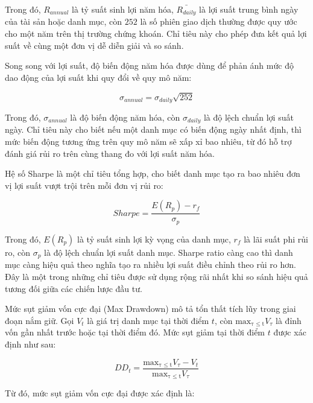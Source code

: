 \documentclass[12pt,a4paper,openany,oneside]{book}
\begin{document}
Trong đó, \({R}_{annual}\) là tỷ suất sinh lợi năm hóa, \(\bar{{R}_{daily}}\) là lợi suất trung bình ngày của tài sản hoặc danh mục, còn \(252\) là số phiên giao dịch thường được quy ước cho một năm trên thị trường chứng khoán. Chỉ tiêu này cho phép đưa kết quả lợi suất về cùng một đơn vị dễ diễn giải và so sánh.

Song song với lợi suất, độ biến động năm hóa được dùng để phản ánh mức độ dao động của lợi suất khi quy đổi về quy mô năm:

\begin{equation}\label{eq:theory-17}
{\sigma}_{annual}={\sigma}_{daily}\sqrt{252}
\end{equation}

Trong đó, \({\sigma}_{annual}\) là độ biến động năm hóa, còn \({\sigma}_{daily}\) là độ lệch chuẩn lợi suất ngày. Chỉ tiêu này cho biết nếu một danh mục có biến động ngày nhất định, thì mức biến động tương ứng trên quy mô năm sẽ xấp xỉ bao nhiêu, từ đó hỗ trợ đánh giá rủi ro trên cùng thang đo với lợi suất năm hóa.

Hệ số Sharpe là một chỉ tiêu tổng hợp, cho biết danh mục tạo ra bao nhiêu đơn vị lợi suất vượt trội trên mỗi đơn vị rủi ro:

\begin{equation}\label{eq:theory-18}
Sharpe=\frac{E\left({R}_{p}\right)-{r}_{f}}{{\sigma}_{p}}
\end{equation}

Trong đó, \(E\left({R}_{p}\right)\) là tỷ suất sinh lợi kỳ vọng của danh mục, \({r}_{f}\) là lãi suất phi rủi ro, còn \({\sigma}_{p}\) là độ lệch chuẩn lợi suất danh mục. Sharpe ratio càng cao thì danh mục càng hiệu quả theo nghĩa tạo ra nhiều lợi suất điều chỉnh theo rủi ro hơn. Đây là một trong những chỉ tiêu được sử dụng rộng rãi nhất khi so sánh hiệu quả tương đối giữa các chiến lược đầu tư.

Mức sụt giảm vốn cực đại (Max Drawdown) mô tả tổn thất tích lũy trong giai đoạn nắm giữ. Gọi \({V}_{t}\) là giá trị danh mục tại thời điểm \(t\), còn \(\operatorname{{max_{\tau\leq t}}}{V}_{\tau}\) là đỉnh vốn gần nhất trước hoặc tại thời điểm đó. Mức sụt giảm tại thời điểm \(t\) được xác định như sau:

\begin{equation}\label{eq:theory-19}
D{D}_{t}=\frac{\operatorname{{max_{\tau\leq t}}}{V}_{\tau}-{V}_{t}}{\operatorname{{max_{\tau\leq t}}}{V}_{\tau}}
\end{equation}

Từ đó, mức sụt giảm vốn cực đại được xác định là:
\end{document}
